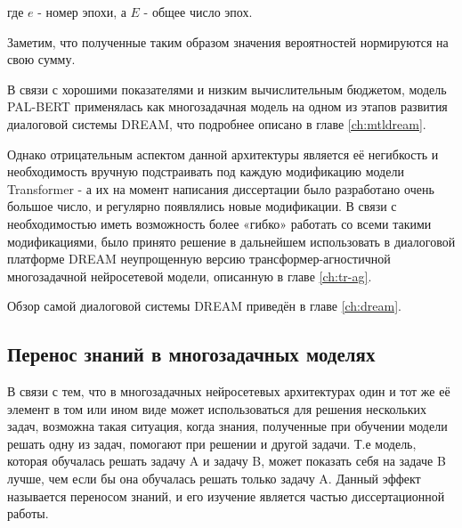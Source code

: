  где $e$ - номер эпохи, а $E$ - общее число эпох. 
 
Заметим, что полученные таким образом значения вероятностей нормируются на свою сумму. 

В связи с хорошими показателями и низким вычислительным бюджетом, модель PAL-BERT применялась как многозадачная модель на одном из этапов развития диалоговой системы DREAM, что подробнее описано в главе \ref{ch:mtldream}.

Однако отрицательным аспектом данной архитектуры является её негибкость и необходимость вручную подстраивать под каждую модификацию модели Transformer - а их на момент написания диссертации было разработано очень большое число, и регулярно появлялись новые модификации. В связи с необходимостью иметь возможность более «гибко» работать со всеми такими модификациями, было принято решение в дальнейшем использовать в диалоговой платформе {DREAM} неупрощенную версию трансформер-агностичной многозадачной нейросетевой модели, описанную в главе \ref{ch:tr-ag}.

Обзор самой диалоговой системы {DREAM} приведён в главе \ref{ch:dream}.

\subsection{Перенос знаний в многозадачных моделях}

В связи с тем, что в многозадачных нейросетевых архитектурах один и тот же её элемент в том или ином виде может использоваться для решения нескольких задач, возможна такая ситуация, когда знания, полученные при обучении модели решать одну из задач, помогают при решении и другой задачи. Т.е модель, которая обучалась решать задачу A и задачу B, может показать себя на задаче B лучше, чем если бы она обучалась решать только задачу A. Данный эффект называется переносом знаний, и его изучение является частью диссертационной работы.
